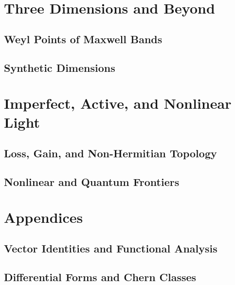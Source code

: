 \documentclass[11pt,twoside,openright]{book}
\theoremstyle{plain}
\theoremstyle{definition}
\theoremstyle{remark}
\begin{document}
\part{Three Dimensions and Beyond}

\chapter{Weyl Points of Maxwell Bands}
\label{ch:weyl-points}


\chapter{Synthetic Dimensions}
\label{ch:synthetic-dimensions}


\part{Imperfect, Active, and Nonlinear Light}

\chapter{Loss, Gain, and Non-Hermitian Topology}
\label{ch:non-hermitian}


\chapter{Nonlinear and Quantum Frontiers}
\label{ch:nonlinear-quantum}


\appendix
\part*{Appendices}

\chapter{Vector Identities and Functional Analysis}
\label{app:vector-identities}


\chapter{Differential Forms and Chern Classes}
\label{app:diff-forms}

\end{document}
